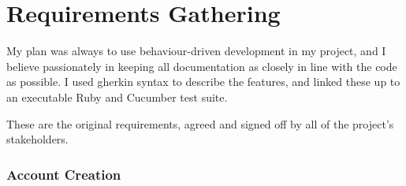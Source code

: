\chapter{Requirements Gathering}\label{appendix:requirements}

My plan was always to use behaviour-driven development in my project, and I believe passionately in keeping all documentation as closely in line with the code as possible. I used gherkin syntax to describe the features, and linked these up to an executable Ruby and Cucumber test suite.

These are the original requirements, agreed and signed off by all of the project's stakeholders. %

\subsection{Account Creation}

